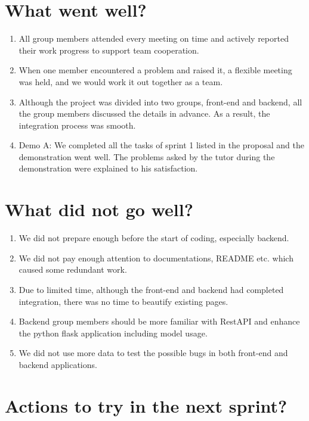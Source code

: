 \documentclass[12pt]{article}
\begin{document}

\tableofcontents
\newpage

\section{What went well?}

\begin{enumerate}
  \item All group members attended every meeting on time and actively reported their work progress to support team cooperation.
  \item When one member encountered a problem and raised it, a flexible meeting was held, and we would work it out together as a team.
  \item Although the project was divided into two groups, front-end and backend, all the group members discussed the details in advance. As a result, the integration process was smooth.
  \item Demo A: We completed all the tasks of sprint 1 listed in the proposal and the demonstration went well. The problems asked by the tutor during the demonstration were explained to his satisfaction.
\end{enumerate}


\section{What did not go well?}

\begin{enumerate}
  \item We did not prepare enough before the start of coding, especially backend.
  \item We did not pay enough attention to documentations, README etc. which caused some redundant work.
  \item Due to limited time, although the front-end and backend had completed integration, there was no time to beautify existing pages.
  \item Backend group members should be more familiar with RestAPI and enhance the python flask application including model usage.
  \item We did not use more data to test the possible bugs in both front-end and backend applications.

\end{enumerate}

\section{Actions to try in the next sprint?}
\end{document}
